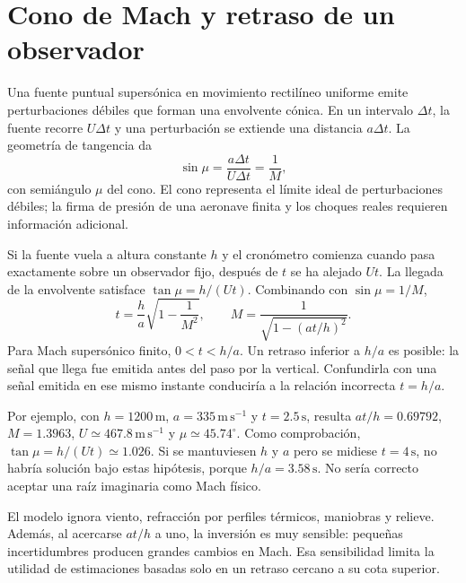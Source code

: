 \section{Cono de Mach y retraso de un observador}
Una fuente puntual supersónica en movimiento rectilíneo uniforme emite perturbaciones débiles que forman una envolvente cónica. En un intervalo $\Delta t$, la fuente recorre $U\Delta t$ y una perturbación se extiende una distancia $a\Delta t$. La geometría de tangencia da
\begin{equation}
 \sin\mu=\frac{a\Delta t}{U\Delta t}=\frac1M,
\end{equation}
con semiángulo $\mu$ del cono. El cono representa el límite ideal de perturbaciones débiles; la firma de presión de una aeronave finita y los choques reales requieren información adicional.


Si la fuente vuela a altura constante $h$ y el cronómetro comienza cuando pasa exactamente sobre un observador fijo, después de $t$ se ha alejado $Ut$. La llegada de la envolvente satisface $\tan\mu=h/(Ut)$. Combinando con $\sin\mu=1/M$,
\begin{equation}\label{eq:08-retraso}
 t=\frac{h}{a}\sqrt{1-\frac1{M^2}},\qquad
 M=\frac1{\sqrt{1-(at/h)^2}}.
\end{equation}
Para Mach supersónico finito, $0<t<h/a$. Un retraso inferior a $h/a$ es posible: la señal que llega fue emitida antes del paso por la vertical. Confundirla con una señal emitida en ese mismo instante conduciría a la relación incorrecta $t=h/a$.

Por ejemplo, con $h=1200\,\mathrm{m}$, $a=335\,\mathrm{m\,s^{-1}}$ y $t=2.5\,\mathrm{s}$, resulta $at/h=0.69792$, $M=1.3963$, $U\simeq467.8\,\mathrm{m\,s^{-1}}$ y $\mu\simeq45.74^\circ$. Como comprobación, $\tan\mu=h/(Ut)\simeq1.026$. Si se mantuviesen $h$ y $a$ pero se midiese $t=4\,\mathrm{s}$, no habría solución bajo estas hipótesis, porque $h/a=3.58\,\mathrm{s}$. No sería correcto aceptar una raíz imaginaria como Mach físico.

El modelo ignora viento, refracción por perfiles térmicos, maniobras y relieve. Además, al acercarse $at/h$ a uno, la inversión es muy sensible: pequeñas incertidumbres producen grandes cambios en Mach. Esa sensibilidad limita la utilidad de estimaciones basadas solo en un retraso cercano a su cota superior.

